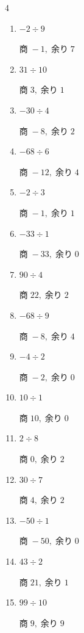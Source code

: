 \begin{multicols}{4}
\begin{enumerate}
  \item $-2 \div 9$

        $商\; -1,\; 余り\; 7$

  \item $31 \div 10$

        $商\; 3,\; 余り\; 1$

  \item $-30 \div 4$

        $商\; -8,\; 余り\; 2$

  \item $-68 \div 6$

        $商\; -12,\; 余り\; 4$

\columnbreak %

  \item $-2 \div 3$

        $商\; -1,\; 余り\; 1$

  \item $-33 \div 1$

        $商\; -33,\; 余り\; 0$

  \item $90 \div 4$

        $商\; 22,\; 余り\; 2$

  \item $-68 \div 9$

        $商\; -8,\; 余り\; 4$

  \item $-4 \div 2$

        $商\; -2,\; 余り\; 0$

  \item $10 \div 1$

        $商\; 10,\; 余り\; 0$

  \item $2 \div 8$

        $商\; 0,\; 余り\; 2$

  \item $30 \div 7$

        $商\; 4,\; 余り\; 2$

  \item $-50 \div 1$

        $商\; -50,\; 余り\; 0$

  \item $43 \div 2$

        $商\; 21,\; 余り\; 1$

  \item $99 \div 10$

        $商\; 9,\; 余り\; 9$


\end{enumerate}
\end{multicols}
